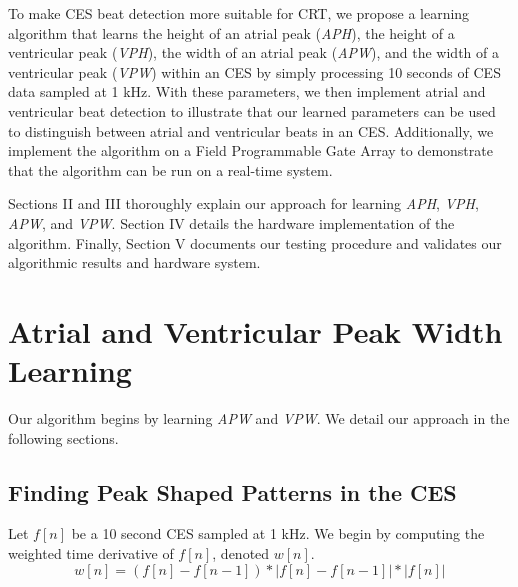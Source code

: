 \documentclass[conference]{IEEEtran}
\newcommand{\APW}{\textit{APW}}
\newcommand{\VPW}{\textit{VPW}}
\newcommand{\APH}{\textit{APH}}
\newcommand{\VPH}{\textit{VPH}}
\begin{document}
To make CES beat detection more suitable for CRT,
we propose a learning algorithm that learns the
height of an atrial peak (\APH), the height of a ventricular
peak (\VPH), the width of an atrial peak (\APW), and the
width of a ventricular peak (\VPW) within an CES
by simply processing 10 seconds of CES data sampled
at 1 kHz. With these parameters, we then implement
atrial and ventricular beat detection to illustrate that our
learned parameters can be used to distinguish between
atrial and ventricular beats in an CES.
Additionally, we implement the algorithm on a Field
Programmable Gate Array to demonstrate that the
algorithm can be run on a real-time system.

Sections II and III thoroughly explain our approach
for learning \APH{}, \VPH{}, \APW{}, and \VPW{}. Section IV
details the hardware implementation of the algorithm.
Finally, Section V documents our testing procedure and
validates our algorithmic results and hardware system.

\section{Atrial and Ventricular Peak Width Learning}
Our algorithm begins by learning \APW{} and \VPW{}. We
detail our approach in the following sections.

\subsection{Finding Peak Shaped Patterns in the CES}
Let $f[n]$ be a 10 second CES sampled at 1 kHz.
We begin by computing the weighted time
derivative of $f[n]$, denoted $w[n]$.
\begin{equation*}
	w[n]=(f[n]-f[n-1]) * \left|f[n] - f[n-1]\right| * \left|f[n]\right|
\end{equation*}
\end{document}
